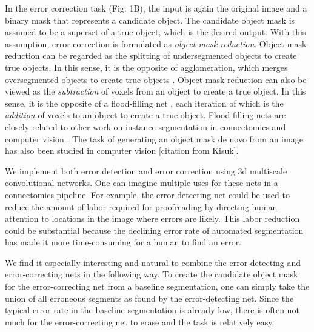 \documentclass{article}
\begin{document}
In the error correction task (Fig. 1B), the input is again the original image and a binary mask that represents a candidate object. The candidate object mask is assumed to be a superset of a true object, which is the desired output. With this assumption, error correction is formulated as \emph{object mask reduction}.
Object mask reduction can be regarded as the splitting of undersegmented objects to create true objects. In this sense, it is the opposite of agglomeration, which merges oversegmented objects to create true objects \cite{lash,gala}. Object mask reduction can also be viewed as the \emph{subtraction} of voxels from an object to create a true object. In this sense, it is the opposite of a flood-filling net \cite{floodfilling,januszewski2017high}, each iteration of which is the \emph{addition} of voxels to an object to create a true object. Flood-filling nets are closely related to other work on instance segmentation in connectomics \cite{multipass} and computer vision \cite{recurrent_instance_seg_1, recurrent_instance_seg_2}.  The task of generating an object mask de novo from an image has also been studied in computer vision [citation from Kisuk].

We implement both error detection and error correction using 3d multiscale convolutional networks.  One can imagine multiple uses for these nets in a connectomics pipeline. For example, the error-detecting net could be used to reduce the amount of labor required for proofreading by directing human attention to locations in the image where errors are likely. This labor reduction could be substantial because the declining error rate of automated segmentation has made it more time-consuming for a human to find an error.

We find it especially interesting and natural to combine the error-detecting and error-correcting nets in the following way. To create the candidate object mask for the error-correcting net from a baseline segmentation, one can simply take the union of all erroneous segments as found by the error-detecting net. Since the typical error rate in the baseline segmentation is already low, there is often not much for the error-correcting net to erase and the task is relatively easy.

\end{document}
